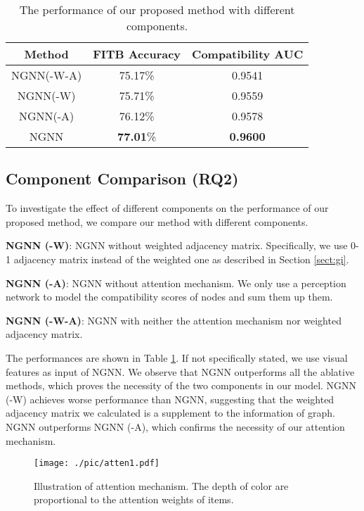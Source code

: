\documentclass[sigconf]{acmart}
\begin{document}
\begin{table}[htbp]
  \centering
  \caption{The performance of our proposed method with different components.}
    \begin{tabular}{ccc}
    \toprule
    Method & FITB Accuracy  &  Compatibility AUC \\
\midrule
    NGNN(-W-A)& 75.17\%   & 0.9541 \\
    NGNN(-W)& 75.71\%  & 0.9559\\
    NGNN(-A)& 76.12\%   & 0.9578 \\
    NGNN& \textbf{77.01}\%  & \textbf{0.9600} \\
    \bottomrule
    \end{tabular}\label{tab:ablation}\end{table}


\subsection{Component Comparison (RQ2)}



To investigate the effect of different components on the performance of our proposed method, we compare our method with different components.

\noindent\textbf{NGNN (-W)}:
NGNN without weighted adjacency matrix. Specifically, we use 0-1 adjacency matrix instead of the weighted one as described in Section \ref{sect:gi}.

\noindent\textbf{NGNN (-A)}: NGNN without attention mechanism. We only use a perception network to model the compatibility scores of nodes and sum them up them.

\noindent\textbf{NGNN (-W-A)}: NGNN with neither the attention mechanism nor weighted adjacency matrix.

The performances are shown in Table \ref{tab:ablation}. If not specifically stated, we use visual features as input of NGNN. We observe that NGNN outperforms all the ablative methods, which proves the necessity of the two components in our model.
NGNN (-W) achieves worse performance than NGNN, suggesting that the weighted adjacency matrix we calculated is a supplement to the information of graph. NGNN outperforms NGNN (-A), which confirms the necessity of our attention mechanism.

\begin{figure}[htbp]

  \centering
\texttt{[image: ./pic/atten1.pdf]}

  \caption{Illustration of attention mechanism. The depth of color are proportional to the attention weights of items.}\label{fig:atten}

\end{figure}
\end{document}
